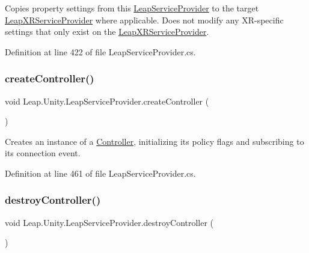 Copies property settings from this \mbox{\hyperlink{class_leap_1_1_unity_1_1_leap_service_provider}{Leap\+Service\+Provider}} to the target \mbox{\hyperlink{class_leap_1_1_unity_1_1_leap_x_r_service_provider}{Leap\+X\+R\+Service\+Provider}} where applicable. Does not modify any X\+R-\/specific settings that only exist on the \mbox{\hyperlink{class_leap_1_1_unity_1_1_leap_x_r_service_provider}{Leap\+X\+R\+Service\+Provider}}. 



Definition at line 422 of file Leap\+Service\+Provider.\+cs.

\mbox{\label{class_leap_1_1_unity_1_1_leap_service_provider_ac79f148cc55c9680e605c48e744971c7}} 
\subsubsection{\texorpdfstring{createController()}{createController()}}
{\footnotesize\ttfamily void Leap.\+Unity.\+Leap\+Service\+Provider.\+create\+Controller (\begin{DoxyParamCaption}{ }\end{DoxyParamCaption})\hspace{0.3cm}{\ttfamily [protected]}}



Creates an instance of a \mbox{\hyperlink{class_leap_1_1_controller}{Controller}}, initializing its policy flags and subscribing to its connection event. 



Definition at line 461 of file Leap\+Service\+Provider.\+cs.

\mbox{\label{class_leap_1_1_unity_1_1_leap_service_provider_aaae9cfba0cd9335579e18dab63c508b0}} 
\subsubsection{\texorpdfstring{destroyController()}{destroyController()}}
{\footnotesize\ttfamily void Leap.\+Unity.\+Leap\+Service\+Provider.\+destroy\+Controller (\begin{DoxyParamCaption}{ }\end{DoxyParamCaption})\hspace{0.3cm}{\ttfamily [protected]}}



